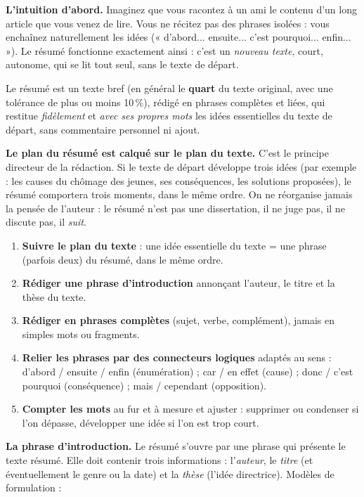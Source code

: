 \documentclass[11pt]{article}
\newcommand{\cle}[1]{{\popxbold\color{popdark}#1}}
\begin{document}
\textbf{L'intuition d'abord.} Imaginez que vous racontez à un ami le contenu d'un long article que vous venez de lire. Vous ne récitez pas des phrases isolées : vous enchaînez naturellement les idées (« d'abord... ensuite... c'est pourquoi... enfin... »). Le résumé fonctionne exactement ainsi : c'est un \emph{nouveau texte}, court, autonome, qui se lit tout seul, sans le texte de départ.

\begin{definition}
Le \cle{résumé} est un texte bref (en général le \textbf{quart} du texte original, avec une tolérance de plus ou moins 10\,\%), rédigé en phrases complètes et liées, qui restitue \emph{fidèlement} et \emph{avec ses propres mots} les idées essentielles du texte de départ, sans commentaire personnel ni ajout.
\end{definition}

\textbf{Le plan du résumé est calqué sur le plan du texte.} C'est le principe directeur de la rédaction. Si le texte de départ développe trois idées (par exemple : les causes du chômage des jeunes, ses conséquences, les solutions proposées), le résumé comportera trois moments, dans le même ordre. On ne réorganise jamais la pensée de l'auteur : le résumé n'est pas une dissertation, il ne juge pas, il ne discute pas, il \emph{suit}.

\begin{methode}
\begin{enumerate}
\item \textbf{Suivre le plan du texte} : une idée essentielle du texte = une phrase (parfois deux) du résumé, dans le même ordre.
\item \textbf{Rédiger une phrase d'introduction} annonçant l'auteur, le titre et la thèse du texte.
\item \textbf{Rédiger en phrases complètes} (sujet, verbe, complément), jamais en simples mots ou fragments.
\item \textbf{Relier les phrases par des connecteurs logiques} adaptés au sens : d'abord / ensuite / enfin (énumération) ; car / en effet (cause) ; donc / c'est pourquoi (conséquence) ; mais / cependant (opposition).
\item \textbf{Compter les mots} au fur et à mesure et ajuster : supprimer ou condenser si l'on dépasse, développer une idée si l'on est trop court.
\end{enumerate}
\end{methode}

\textbf{La phrase d'introduction.} Le résumé s'ouvre par une phrase qui présente le texte résumé. Elle doit contenir trois informations : l'\emph{auteur}, le \emph{titre} (et éventuellement le genre ou la date) et la \emph{thèse} (l'idée directrice). Modèles de formulation :
\end{document}
